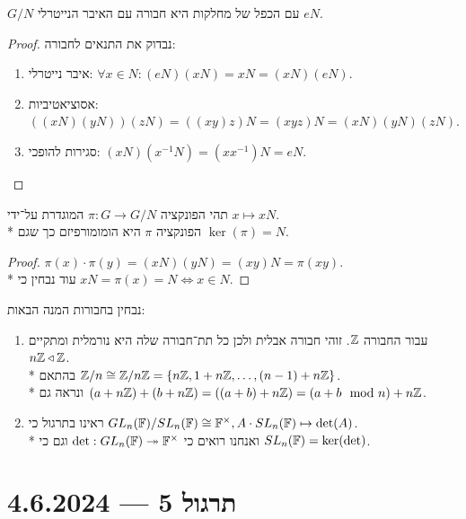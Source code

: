\begin{proposition}
	$G/N$ עם הכפל של מחלקות היא חבורה עם האיבר הנייטרלי $eN$.
\end{proposition}
\begin{proof}
	נבדוק את התנאים לחבורה:
	\begin{enumerate}
		\item איבר נייטרלי: $\forall x \in N: (eN)(xN) = xN = (xN)(eN)$.
		\item אסוציאטיביות: $((xN)(yN))(zN) = ((xy)z)N = (xyz)N = (xN)(yN)(zN)$.
		\item סגירות להופכי: $(xN)(x^{-1}N) = (xx^{-1})N = eN$.
	\end{enumerate}
\end{proof}
\begin{proposition}
	תהי הפונקציה $\pi : G \to G/N$ המוגדרת על־ידי $x \mapsto x N$. \\*
	הפונקציה $\pi$ היא הומומורפיזם כך שגם $\ker(\pi) = N$.
\end{proposition}
\begin{proof}
	$\pi(x) \cdot \pi(y) = (xN)(yN) = (xy)N = \pi(xy)$. \\*
	עוד נבחין כי $x N = \pi(x) = N \iff x \in N$.
\end{proof}
\begin{example}
	נבחין בחבורות המנה הבאות:
	\begin{enumerate}
		\item עבור החבורה $\mathbb{Z}$. זוהי חבורה אבלית ולכן כל תת־חבורה שלה היא נורמלית ומתקיים $n \mathbb{Z} \triangleleft \mathbb{Z}$. \\*
			בהתאם $\mathbb{Z}/n \cong \mathbb{Z} / n \mathbb{Z} = \{ n \mathbb{Z}, 1 + n \mathbb{Z}, \dots, (n - 1) + n \mathbb{Z} \}$. \\*
			ונראה גם $(a + n \mathbb{Z}) + (b + n \mathbb{Z}) = ((a + b) + n \mathbb{Z}) = (a + b \mod n) + n \mathbb{Z}$.
		\item ראינו בתרגול כי $GL_n(\mathbb{F}) / SL_n(\mathbb{F}) \cong \mathbb{F}^\times, A \cdot SL_n(\mathbb{F}) \mapsto \det(A)$. \\*
			ואנחנו רואים כי $\det : GL_n(\mathbb{F}) \twoheadrightarrow \mathbb{F}^\times$ וגם כי $SL_n(\mathbb{F}) = \ker(\det)$.
	\end{enumerate}
\end{example}

\section{תרגול 5 --- 4.6.2024}
